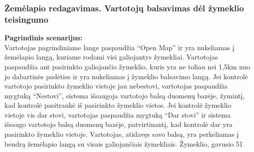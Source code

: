 \documentclass{VUMIFPSkursinis}
\begin{document}
\subsubsection{Žemėlapio redagavimas. Vartotojų balsavimas dėl žymeklio teisingumo}
	\textbf{Pagrindinis scenarijus:}\\
	Vartotojas pagrindiniame lange paspaudžia “Open Map” ir yra nukeliamas į žemėlapio langą, kuriame rodomi visi galiojantys žymekliai. 
	Vartotojas paspaudžia ant pasirinkto galiojančio žymeklio, kuris yra ne toliau nei 1,5km nuo jo dabartinės padėties ir yra nukeliamas 
	į žymeklio balsavimo langą. Jei kontrolė vartotojo pasirinkto žymeklio vietoje jau nebestovi, vartotojas paspaudžia mygtuką “Nestovi”, 
	sistema išsaugoja vartotojo balsą duomenų bazėje, žymintį, kad kontrolė pasitraukė iš pasirinkto žymeklio vietos. Jei kontrolė žymeklio 
	vietoje vis dar stovi, vartotojas paspaudžia mygtuką “Dar stovi” ir sistema išsaugo vartotojo balsą duomenų bazėje, patvirtinantį, kad 
	kontrolė dar yra pasirinkto žymeklio vietoje. Vartotojas, atidavęs savo balsą, yra perkeliamas į bendrą žemėlapio langą su visais 
	galiojančiais žymekliais. Žymeklio, gavusio 51%
\end{document}
